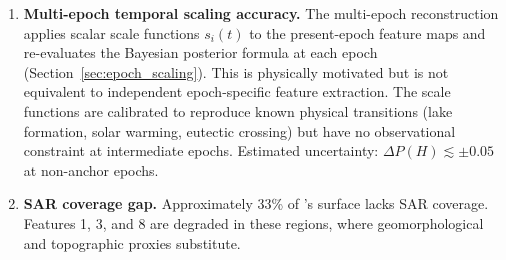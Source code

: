 \begin{enumerate}[leftmargin=*,label=\textbf{A\arabic*.}]
\item \textbf{Multi-epoch temporal scaling accuracy.}  The multi-epoch
reconstruction applies scalar scale functions $s_i(t)$ to the present-epoch
feature maps and re-evaluates the Bayesian posterior formula at each epoch
(Section~\ref{sec:epoch_scaling}).  This is physically motivated but
is not equivalent to independent epoch-specific feature extraction.
The scale functions are calibrated to reproduce known physical transitions
(lake formation, solar warming, eutectic crossing) but have no observational
constraint at intermediate epochs.  Estimated uncertainty:
$\Delta P(H) \lesssim \pm0.05$ at non-anchor epochs.

\item \textbf{SAR coverage gap.}  Approximately 33\% of \titan{}'s
surface lacks SAR coverage.  Features 1, 3, and 8 are degraded in
these regions, where geomorphological and topographic proxies
substitute.

\end{enumerate}
